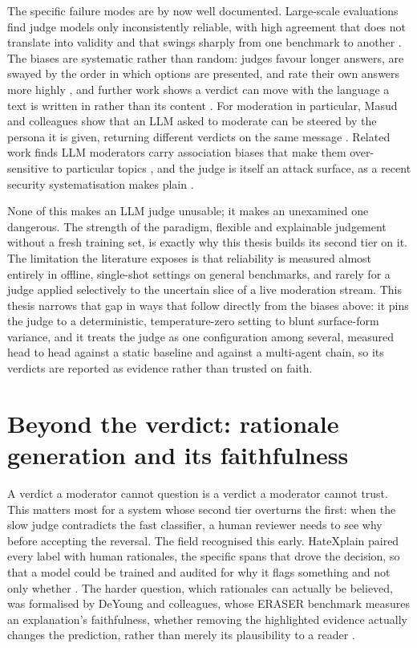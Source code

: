 The specific failure modes are by now well documented. Large-scale evaluations find judge models only inconsistently reliable, with high agreement that does not translate into validity and that swings sharply from one benchmark to another \citep{judgereliability2026}. The biases are systematic rather than random: judges favour longer answers, are swayed by the order in which options are presented, and rate their own answers more highly \citep{llmjudge2023}, and further work shows a verdict can move with the language a text is written in rather than its content \citep{judgebias2026}. For moderation in particular, Masud and colleagues show that an LLM asked to moderate can be steered by the persona it is given, returning different verdicts on the same message \citep{hatepersonified2024}. Related work finds LLM moderators carry association biases that make them over-sensitive to particular topics \citep{moderationbias2025}, and the judge is itself an attack surface, as a recent security systematisation makes plain \citep{judgesecurity2026}.

None of this makes an LLM judge unusable; it makes an unexamined one dangerous. The strength of the paradigm, flexible and explainable judgement without a fresh training set, is exactly why this thesis builds its second tier on it. The limitation the literature exposes is that reliability is measured almost entirely in offline, single-shot settings on general benchmarks, and rarely for a judge applied selectively to the uncertain slice of a live moderation stream. This thesis narrows that gap in ways that follow directly from the biases above: it pins the judge to a deterministic, temperature-zero setting to blunt surface-form variance, and it treats the judge as one configuration among several, measured head to head against a static baseline and against a multi-agent chain, so its verdicts are reported as evidence rather than trusted on faith.

\section{Beyond the verdict: rationale generation and its faithfulness}\label{explainability-rationale}

A verdict a moderator cannot question is a verdict a moderator cannot trust. This matters most for a system whose second tier overturns the first: when the slow judge contradicts the fast classifier, a human reviewer needs to see why before accepting the reversal. The field recognised this early. HateXplain paired every label with human rationales, the specific spans that drove the decision, so that a model could be trained and audited for why it flags something and not only whether \citep{hatexplain2021}. The harder question, which rationales can actually be believed, was formalised by DeYoung and colleagues, whose ERASER benchmark measures an explanation's faithfulness, whether removing the highlighted evidence actually changes the prediction, rather than merely its plausibility to a reader \citep{deyoung2020eraser}.

